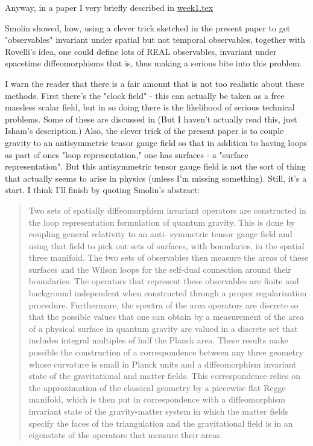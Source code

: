 Anyway, in a paper I very briefly described in {\hyperref[week1]{week1.tex}}


Smolin showed, how, using a clever trick sketched in the present paper to get "observables" invariant under spatial but not temporal observables, together with Rovelli's idea, one could define lots of REAL observables, invariant under spacetime diffeomorphisms that is, thus making a serious bite into this problem.

I warn the reader that there is a fair amount that is not too realistic about these methods. First there's the "clock field" - this can actually be taken as a free massless scalar field, but in so doing there is the likelihood of serious technical problems. Some of these are discussed in
(But I haven't actually read this, just Isham's description.) Also, the clever trick of the present paper is to couple gravity to an antisymmetric tensor gauge field so that in addition to having loops as part of ones "loop representation," one has surfaces - a "surface representation". But this antisymmetric tensor gauge field is not the sort of thing that actually seems to arise in physics (unless I'm missing something). Still, it's a start. I think I'll finish by quoting Smolin's abstract:
\begin{quote}
    Two sets of spatially diffeomorphism invariant operators are constructed in the loop representation formulation of quantum gravity. This is done by coupling general relativity to an anti- symmetric tensor gauge field and using that field to pick out sets of surfaces, with boundaries, in the spatial three manifold. The two sets of observables then measure the areas of these surfaces and the Wilson loops for the self-dual connection around their boundaries. The operators that represent these observables are finite and background independent when constructed through a proper regularization procedure. Furthermore, the spectra of the area operators are discrete so that the possible values that one can obtain by a measurement of the area of a physical surface in quantum gravity are valued in a discrete set that includes integral multiples of half the Planck area. These results make possible the construction of a correspondence between any three geometry whose curvature is small in Planck units and a diffeomorphism invariant state of the gravitational and matter fields. This correspondence relies on the approximation of the classical geometry by a piecewise flat Regge manifold, which is then put in correspondence with a diffeomorphism invariant state of the gravity-matter system in which the matter fields specify the faces of the triangulation and the gravitational field is in an eigenstate of the operators that measure their areas.
\end{quote}


